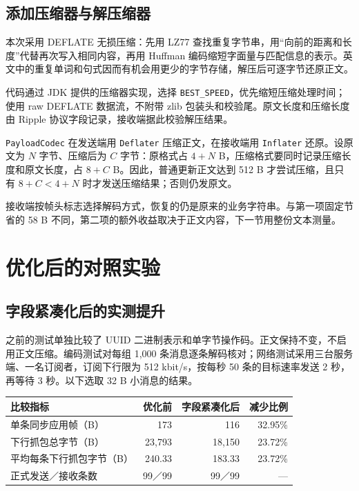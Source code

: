 \documentclass[UTF8,a4paper,11pt,fontset=fandol]{ctexart}
\newcommand{\code}[1]{\nolinkurl{#1}}
\begin{document}
\subsection{添加压缩器与解压缩器}

本次采用 DEFLATE 无损压缩：先用 LZ77 查找重复字节串，用“向前的距离和长度”代替再次写入相同内容，再用 Huffman 编码缩短字面量与匹配信息的表示。英文中的重复单词和句式因而有机会用更少的字节存储，解压后可逐字节还原正文。

代码通过 JDK 提供的压缩器实现，选择 \code{BEST_SPEED}，优先缩短压缩处理时间；使用 raw DEFLATE 数据流，不附带 zlib 包装头和校验尾。原文长度和压缩长度由 Ripple 协议字段记录，接收端据此校验解压结果。

\code{PayloadCodec} 在发送端用 \code{Deflater} 压缩正文，在接收端用 \code{Inflater} 还原。设原文为 $N$ 字节、压缩后为 $C$ 字节：原格式占 $4+N$ B，压缩格式要同时记录压缩长度和原文长度，占 $8+C$ B。因此，普通更新正文达到 512 B 才尝试压缩，且只有 $8+C<4+N$ 时才发送压缩结果；否则仍发原文。

接收端按帧头标志选择解码方式，恢复的仍是原来的业务字符串。与第一项固定节省的 58 B 不同，第二项的额外收益取决于正文内容，下一节用整份文本测量。

\newpage
\section{优化后的对照实验}
\subsection{字段紧凑化后的实测提升}
之前的测试单独比较了 UUID 二进制表示和单字节操作码。正文保持不变，不启用正文压缩。编码测试对每组 1,000 条消息逐条解码核对；网络测试采用三台服务端、一名订阅者，订阅下行限为 512 kbit/s，按每秒 50 条的目标速率发送 2 秒，再等待 3 秒。以下选取 32 B 小消息的结果。

\begin{center}\small\begin{tabular}{lrrr}\toprule
比较指标 & 优化前 & 字段紧凑化后 & 减少比例\\\midrule
单条同步应用帧（B） & 173 & 116 & 32.95\%\\
下行抓包总字节（B） & 23,793 & 18,150 & 23.72\%\\
平均每条下行抓包字节（B） & 240.33 & 183.33 & 23.72\%\\
正式发送／接收条数 & 99／99 & 99／99 & ---\\\bottomrule
\end{tabular}\end{center}
\end{document}
